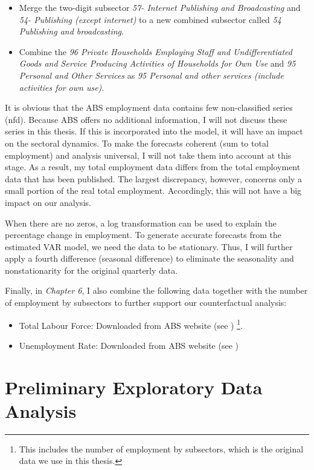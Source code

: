 \documentclass{monashthesis}
\begin{document}
\begin{itemize}
\item
  Merge the two-digit subsector \emph{57- Internet Publishing and Broadcasting} and \emph{54- Publishing (except internet)} to a new combined subsector called \emph{54 Publishing and broadcasting}.
\item
  Combine the \emph{96 Private Households Employing Staff and Undifferentiated Goods and Service Producing Activities of Households for Own Use} and \emph{95 Personal and Other Services} as \emph{95 Personal and other services (include activities for own use)}.
\end{itemize}

It is obvious that the ABS employment data contains few non-classified series (nfd). Because ABS offers no additional information, I will not discuss these series in this thesis. If this is incorporated into the model, it will have an impact on the sectoral dynamics. To make the forecasts coherent (sum to total employment) and analysis universal, I will not take them into account at this stage. As a result, my total employment data differs from the total employment data that has been published. The largest discrepancy, however, concerns only a small portion of the real total employment. Accordingly, this will not have a big impact on our analysis.

When there are no zeros, a log transformation can be used to explain the percentage change in employment. To generate accurate forecasts from the estimated VAR model, we need the data to be stationary. Thus, I will further apply a fourth difference (seasonal difference) to eliminate the seasonality and nonstationarity for the original quarterly data.

Finally, in \emph{Chapter 6}, I also combine the following data together with the number of employment by subsectors \autocite{ABS2022} to further support our counterfactual analysis:

\begin{itemize}
\item
  Total Labour Force: Downloaded from ABS website (see \textcite{ABS2022}) \footnote{This includes the number of employment by subsectors, which is the original data we use in this thesis.}.
\item
  Unemployment Rate: Downloaded from ABS website (see \textcite{ABS2022a})
\end{itemize}

\hypertarget{preliminary-exploratory-data-analysis}{%
\section{Preliminary Exploratory Data Analysis}\label{preliminary-exploratory-data-analysis}}
\end{document}
